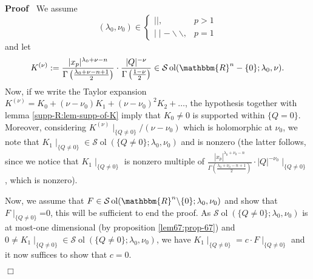 \documentclass[12pt]{article}
\newcommand{\assign}{:=}
\newcommand{\tmop}[1]{\ensuremath{\operatorname{#1}}}
\newcommand{\um}{-}
\renewenvironment{proof}{\noindent\textbf{Proof\ }}{\hspace*{\fill}$\Box$\medskip}
\theoremstyle{remark}
\begin{document}
\begin{proof}
  We assume
  \[ (\lambda_0, \nu_0) \in \left\{ \begin{array}{ll}
       \mid \mid, & p > 1\\
       \mid \mid \um \backslash\backslash, & p = 1
     \end{array} \right. \]
  and let
  \[ K^{(\nu)} \assign \frac{| x_p |^{\lambda_0 + \nu - n}}{\Gamma \left(
     \frac{\lambda_0 + \nu - n + 1}{2} \right)} \cdot \frac{| Q |^{-
     \nu}}{\Gamma \left( \frac{1 - \nu}{2} \right)} \in \mathcal{S} \tmop{ol}
     (\mathbbm{R}^n - \{ 0 \} ; \lambda_0, \nu) . \]
  Now, if we write the Taylor expansion $K^{(\nu)} = K_0 + (\nu - \nu_0)
  K_1 + (\nu - \nu_0)^2 K_2 + \ldots$, the hypothesis together with lemma
  \ref{supp-R:lem-supp-of-K} imply that $K_0 \neq 0$ is supported within $\{ Q
  = 0 \}$. Moreover, considering $K^{(\nu)} \mid_{\{ Q \neq 0 \}} / (\nu -
  \nu_0)$ which is holomorphic at $\nu_0$, we note that $K_1 \mid_{\{ Q
  \neq 0 \}} \in \mathcal{S} \tmop{ol} (\{ Q \neq 0 \} ; \lambda_0, \nu_0)$
  and is nonzero (the latter follows, since we notice that $K_1 \mid_{\{ Q
  \neq 0 \}}$ is nonzero multiple of $\frac{| x_p |^{\lambda_0 + \nu_0 -
  n}}{\Gamma \left( \frac{\lambda_0 + \nu_0 - n + 1}{2} \right)} \cdot | Q
  |^{- \nu_0} \mid_{\{ Q \neq 0 \}}$, which is nonzero).
  
  Now, we assume that $F \in \mathcal{S} \tmop{ol} (\mathbbm{R}^n \backslash
  \{ 0 \} ; \lambda_0, \nu_0)$ and show that $F \mid_{\{ Q \neq 0 \}}$=0,
  this will be sufficient to end the proof. As $\mathcal{S} \tmop{ol} (\{ Q
  \neq 0 \} ; \lambda_0, \nu_0)$ is at most-one dimensional (by proposition
  \ref{lem67:prop-67}) and $0 \neq K_1 \mid_{\{ Q \neq 0 \}} \in
  \mathcal{S} \tmop{ol} (\{ Q \neq 0 \} ; \lambda_0, \nu_0)$, we have $K_1
  \mid_{\{ Q \neq 0 \}} = c \cdot F \mid_{\{ Q \neq 0 \}}$ and it now
  suffices to show that $c = 0$.
  

\end{proof}
\end{document}

